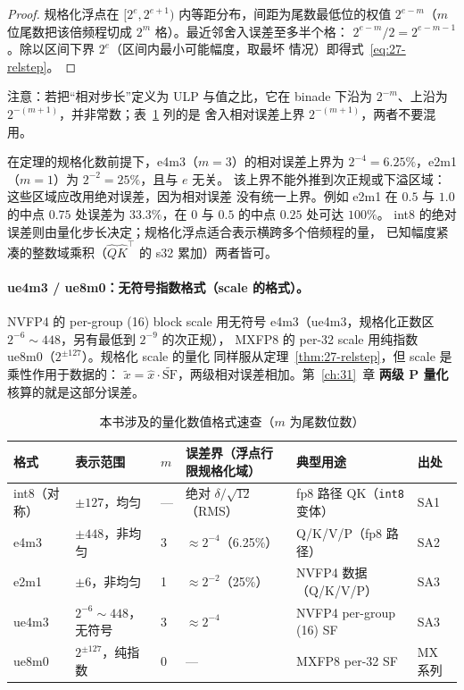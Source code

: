 \begin{proof}
规格化浮点在 $[2^{e}, 2^{e+1})$ 内等距分布，间距为尾数最低位的权值
$2^{e-m}$（$m$ 位尾数把该倍频程切成 $2^{m}$ 格）。最近邻舍入误差至多半个格：
$2^{e-m}/2 = 2^{e-m-1}$。除以区间下界 $2^{e}$（区间内最小可能幅度，取最坏
情况）即得式~\ref{eq:27-relstep}。
\end{proof}

注意：若把“相对步长”定义为 ULP 与值之比，它在 binade 下沿为
$2^{-m}$、上沿为 $2^{-(m+1)}$，并非常数；表~\ref{tab:27-formats} 列的是
舍入相对误差上界 $2^{-(m+1)}$，两者不要混用。

在定理的规格化数前提下，e4m3（$m{=}3$）的相对误差上界为
$2^{-4}=6.25\%$，e2m1（$m{=}1$）为 $2^{-2}=25\%$，且与 $e$ 无关。
该上界不能外推到次正规或下溢区域：这些区域应改用绝对误差，因为相对误差
没有统一上界。例如 e2m1 在 $0.5$ 与 $1.0$ 的中点 $0.75$ 处误差为
$33.3\%$，在 $0$ 与 $0.5$ 的中点 $0.25$ 处可达 $100\%$。
int8 的绝对误差则由量化步长决定；规格化浮点适合表示横跨多个倍频程的量，
已知幅度紧凑的整数域乘积（$\hat{Q}\hat{K}^{\top}$ 的 s32 累加）两者皆可。

\paragraph{ue4m3 / ue8m0：无符号指数格式（scale 的格式）。}
NVFP4 的 per-group (16) block scale 用无符号 e4m3（ue4m3，规格化正数区
$2^{-6} \sim 448$，另有最低到 $2^{-9}$ 的次正规），
MXFP8 的 per-32 scale 用纯指数 ue8m0（$2^{\pm127}$）。规格化 scale 的量化
同样服从定理~\ref{thm:27-relstep}，但 scale 是乘性作用于数据的：
$\tilde{x} = \hat{x} \cdot \widetilde{\mathrm{SF}}$，两级相对误差相加。第~\ref{ch:31}~章
\textbf{两级 P 量化}核算的就是这部分误差。

\begin{table}[htbp]
  \centering
  \caption{本书涉及的量化数值格式速查（$m$ 为尾数位数）}
  \label{tab:27-formats}
  \begin{tabular}{llllll}
    \toprule
    格式 & 表示范围 & $m$ & 误差界（浮点行限规格化域） & 典型用途 & 出处 \\
    \midrule
    int8（对称） & $\pm127$，均匀 & — & 绝对 $\delta/\sqrt{12}$（RMS） & fp8 路径 QK（\texttt{int8} 变体） & SA1 \\
    e4m3 & $\pm448$，非均匀 & 3 & $\approx 2^{-4}$（6.25\%） & Q/K/V/P（fp8 路径） & SA2 \\
    e2m1 & $\pm 6$，非均匀 & 1 & $\approx 2^{-2}$（25\%） & NVFP4 数据（Q/K/V/P） & SA3 \\
    ue4m3 & $2^{-6}\sim448$，无符号 & 3 & $\approx 2^{-4}$ & NVFP4 per-group (16) SF & SA3 \\
    ue8m0 & $2^{\pm127}$，纯指数 & 0 & — & MXFP8 per-32 SF & MX 系列 \\
    \bottomrule
  \end{tabular}
\end{table}


